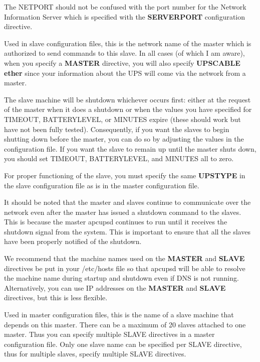 {{{{{{{{{{{{\begin{description}
{The NETPORT should not be confused with the port number for the Network
Information Server which is specified with the {\bf SERVERPORT} configuration
directive.  

\item [MASTER \lt{}name of the master\gt{} for slave machines.]
   Used in slave configuration files, this is the network name of the master
which is authorized to send commands to this slave. In all cases (of which I
am aware), when you specify a {\bf MASTER} directive, you will also specify
{\bf UPSCABLE ether} since your information about the UPS will come via the
network from a master.  

The slave machine will be shutdown whichever occurs first: either at the
request of the master when it does a shutdown or when the values you have
specified for TIMEOUT, BATTERYLEVEL, or MINUTES expire (these should work but
have not been fully tested). Consequently, if you want the slaves to begin
shutting down before the master, you can do so by adjusting the values in the
configuration file. If you want the slave to remain up until the master shuts
down, you should set TIMEOUT, BATTERYLEVEL, and MINUTES all to zero.  

For proper functioning of the slave, you must specify the same {\bf UPSTYPE}
in the slave configuration file as is in the master configuration file.  

It should be noted that the master and slaves continue to communicate over the
network even after the master has issued a shutdown command to the slaves.
This is because the master apcupsd continues to run until it receives the
shutdown signal from the system. This is important to ensure that all the
slaves have been properly notified of the shutdown.  

We recommend that the machine names used on the {\bf MASTER} and {\bf SLAVE}
directives be put in your /etc/hosts file so that apcupsd will be able to
resolve the machine name during startup and shutdown even if DNS is not
running. Alternatively, you can use IP addresses on the {\bf MASTER} and {\bf
SLAVE} directives, but this is less flexible.  

\item [SLAVE \lt{}name of slave(s)\gt{} used only in MASTER configuration
   files.]
Used in master configuration files, this is the name of a slave machine that
depends on this master. There can be a maximum of 20 slaves attached to one
master. Thus you can specify multiple SLAVE directives in a master
configuration file. Only one slave name can be specified per SLAVE directive,
thus for multiple slaves, specify multiple SLAVE directives.  

}
\end{description}}}}}}}}}}}}}
